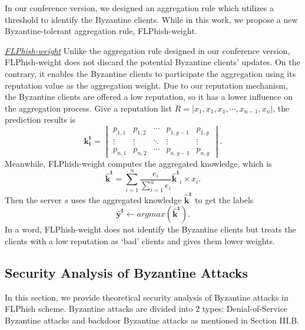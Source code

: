 \documentclass[journal]{IEEEtran}
\begin{document}
\par In our conference version, we designed an aggregation rule which utilizes a threshold to identify the Byzantine clients. While in this work, we propose a new Byzantine-tolerant aggregation rule, FLPhish-weight.
\par\textit{\ul{FLPhish-weight}} Unlike the aggregation rule designed in our conference version, FLPhish-weight does not discard the potential Byzantine clients' updates. On the contrary, it enables the Byzantine clients to participate the aggregation using its reputation value as the aggregation weight. Due to our reputation mechanism, the Byzantine clients are offered a low reputation, so it has a lower influence on the aggregation process.
Give a reputation list $R=\left | x_{1},x_{1},x_{1},\cdots ,x_{n-1},x_{n} \right |$, the prediction results is 
\begin{equation}
  \mathbf{k_i^t}=\begin{vmatrix}
    p_{1,1} & p_{1,2} & \cdots  & p_{1,g-1} & p_{1,g}\\ 
    \vdots  & \vdots & \ddots  & \vdots & \vdots\\ 
    p_{n,1} & p_{n,2} & \cdots  & p_{n,g-1} & p_{n,g}
    \end{vmatrix}.
\end{equation}
Meanwhile, FLPhish-weight computes the aggregated knowledge, which is
  \begin{equation}
  \mathbf{\hat{k}^t}=\sum_{i=1}^{u}\frac{e_i}{\sum_{i=1}^{u}e_i}\mathbf{\hat{k}^t}_i\times x_{i}.
\end{equation}
Then the server $s$ uses the aggregated knowledge $\mathbf{\hat{k}^t}$ to get the labels
\begin{equation}
  \mathbf{\hat{y}^t}\gets argmax(\mathbf{\hat{k}^t}).
\end{equation} 
In a word, FLPhish-weight does not identify the Byzantine clients but treats the clients with a low reputation as `bad' clients and gives them lower weights.


\subsection{Security Analysis of Byzantine Attacks}
\par In this section, we provide theoretical security analysis of Byzantine attacks in FLPhish scheme. Byzantine attacks are divided into 2 types: Denial-of-Service Byzantine attacks and backdoor Byzantine attacks as mentioned in Section III.B.
\end{document}
